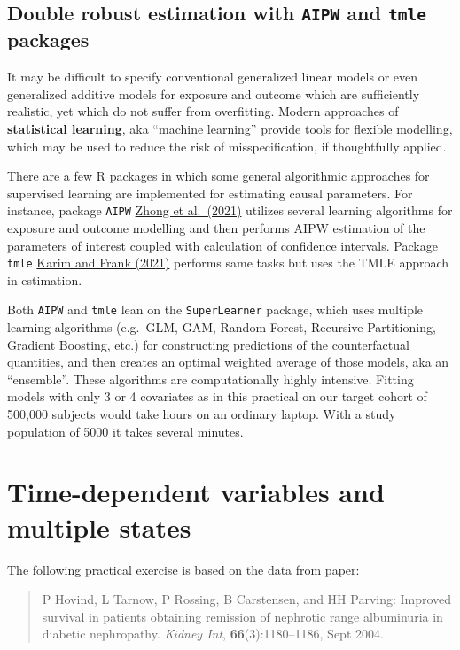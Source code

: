 \documentclass[
]{book}
\begin{document}
\section{\texorpdfstring{Double robust estimation with \texttt{AIPW} and \texttt{tmle} packages}{Double robust estimation with AIPW and tmle packages}}\label{double-robust-estimation-with-aipw-and-tmle-packages}

It may be difficult to specify
conventional generalized linear models
or even generalized additive
models for exposure and outcome which are
sufficiently realistic, yet which do not suffer from overfitting.
Modern approaches of \textbf{statistical learning}, aka
``machine learning'' provide tools for flexible modelling,
which may be used to reduce the risk of misspecification,
if thoughtfully applied.

There are a few R packages in which some general
algorithmic approaches for supervised learning
are implemented for estimating causal parameters.
For instance, package \texttt{AIPW}
\href{https://doi.org/10.1093/aje/kwab207}{Zhong et al.~(2021)}
utilizes
several learning algorithms for exposure and outcome modelling
and then performs AIPW estimation of the
parameters of interest coupled with
calculation of confidence intervals. Package \texttt{tmle}
\href{https://ehsanx.github.io/TMLEworkshop/}{Karim and Frank (2021)}
performs same tasks but uses the TMLE approach
in estimation.

Both \texttt{AIPW} and \texttt{tmle} lean on the
\texttt{SuperLearner} package, which uses multiple learning
algorithms (e.g.~GLM, GAM, Random Forest, Recursive Partitioning,
Gradient Boosting, etc.) for constructing
predictions of the counterfactual quantities, and
then creates an optimal weighted average of those models,
aka an ``ensemble''. These algorithms are computationally
highly intensive. Fitting models with only 3 or 4
covariates as in this practical
on our target cohort of 500,000 subjects
would take hours on an ordinary laptop. With a study population
of 5000 it takes several minutes.

\chapter{Time-dependent variables and multiple states}\label{time-dependent-variables-and-multiple-states}

The following practical exercise is based on the data from paper:

\begin{quote}
P Hovind, L Tarnow, P Rossing, B Carstensen, and HH Parving:
Improved survival in patients obtaining remission of nephrotic range
albuminuria in diabetic nephropathy.
\emph{Kidney Int}, \textbf{66}(3):1180--1186, Sept 2004.
\end{quote}
\end{document}
